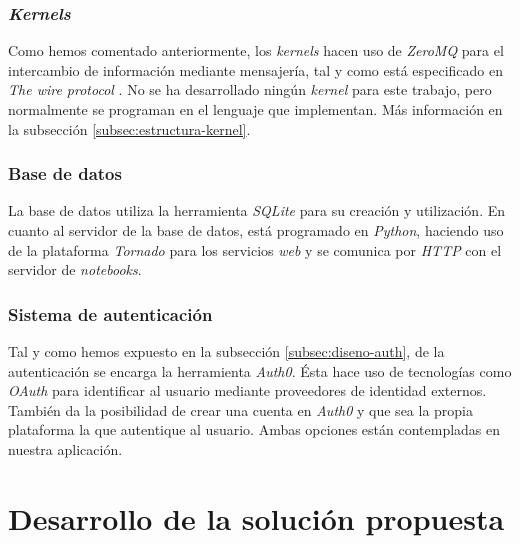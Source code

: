 \documentclass[11pt,spanish,listoffigures]{tfgetsinf}
\begin{document}
\subsection{\textit{Kernels}}
\label{subsec:tecno-kernels}

Como hemos comentado anteriormente, los \textit{kernels} hacen uso de \textit{ZeroMQ} para el intercambio de información mediante mensajería, tal y como está especificado en \textit{The wire protocol} \cite{wire-protocol}. No se ha desarrollado ningún \textit{kernel} para este trabajo, pero normalmente se programan en el lenguaje que implementan. Más información en la subsección \ref{subsec:estructura-kernel}.


\subsection{Base de datos}
\label{subsec:tecno-DB}

La base de datos utiliza la herramienta \textit{SQLite} para su creación y utilización. En cuanto al servidor de la base de datos, está programado en \textit{Python}, haciendo uso de la plataforma \textit{Tornado} para los servicios \textit{web} y se comunica por \textit{HTTP} con el servidor de \textit{notebooks}.


\subsection{Sistema de autenticación}
\label{subsec:tecno-auth}

Tal y como hemos expuesto en la subsección \ref{subsec:diseno-auth}, de la autenticación se encarga la herramienta \textit{Auth0}. Ésta hace uso de tecnologías como \textit{OAuth} para identificar al usuario mediante proveedores de identidad externos. También da la posibilidad de crear una cuenta en \textit{Auth0} y que sea la propia plataforma la que autentique al usuario. Ambas opciones están contempladas en nuestra aplicación.





\chapter{Desarrollo de la solución propuesta}
\label{ch:desarrollo-solucion}
\end{document}
